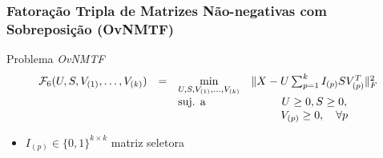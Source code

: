 \documentclass[10pt]{beamer}
\DeclarePairedDelimiter\norm{\lVert}{\rVert}
\begin{document}
\begin{frame}
  \frametitle{Fatoração Tripla de Matrizes Não-negativas com Sobreposição (OvNMTF)}

  \begin{block}{Problema \textit{OvNMTF}}
    \begin{equation}
        \begin{array}{lclc}
            \displaystyle \mathcal{F}_6(U, S, V_{(1)}, \dots, V_{(k)}) & = & \displaystyle \min_{U, S, V_{(1)}, \dots, V_{(k)}} & \norm{X - U\sum_{p=1}^{k}I_{(p)}SV_{(p)}^T}^{2}_{F} \\
                                                                       &   & \text{suj. a}                & U \geq 0, S \geq 0, \\
                                                                       &   &                              & V_{(p)} \geq 0, \quad \forall p
        \end{array} \nonumber
    \end{equation}
    \begin{itemize}
      \item $I_{(p)} \in \{0,1\}^{k \times k}$ matriz seletora
    \end{itemize}
  \end{block}

\end{frame}


\end{document}
